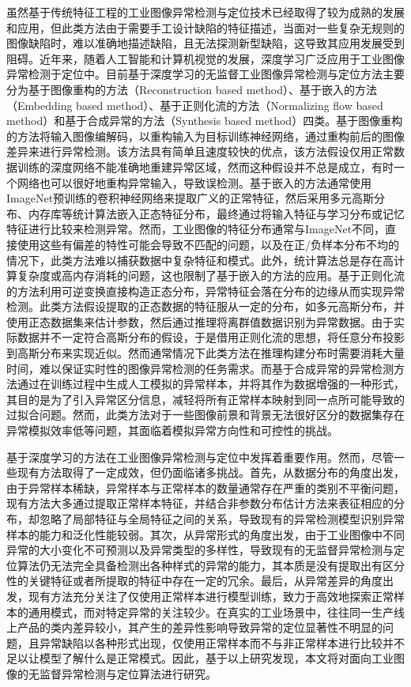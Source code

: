 \documentclass[lang=chs, degree=master, blindreview=false, adobe=false]{yanputhesis}
\begin{document}
虽然基于传统特征工程的工业图像异常检测与定位技术已经取得了较为成熟的发展和应用，但此类方法由于需要手工设计缺陷的特征描述，当面对一些复杂无规则的图像缺陷时，难以准确地描述缺陷，且无法探测新型缺陷，这导致其应用发展受到阻碍。近年来，随着人工智能和计算机视觉的发展，深度学习广泛应用于工业图像异常检测于定位中。目前基于深度学习的无监督工业图像异常检测与定位方法主要分为基于图像重构的方法（Reconstruction based method）、基于嵌入的方法（Embedding based method）、基于正则化流的方法（Normalizing flow based method）和基于合成异常的方法（Synthesis based method）四类。基于图像重构的方法将输入图像编解码，以重构输入为目标训练神经网络，通过重构前后的图像差异来进行异常检测。该方法具有简单且速度较快的优点，该方法假设仅用正常数据训练的深度网络不能准确地重建异常区域，然而这种假设并不总是成立，有时一个网络也可以很好地重构异常输入，导致误检测。基于嵌入的方法通常使用ImageNet预训练的卷积神经网络来提取广义的正常特征，然后采用多元高斯分布、内存库等统计算法嵌入正态特征分布，最终通过将输入特征与学习分布或记忆特征进行比较来检测异常。然而，工业图像的特征分布通常与ImageNet不同，直接使用这些有偏差的特性可能会导致不匹配的问题，以及在正/负样本分布不均的情况下，此类方法难以捕获数据中复杂特征和模式。此外，统计算法总是存在高计算复杂度或高内存消耗的问题，这也限制了基于嵌入的方法的应用。基于正则化流的方法利用可逆变换直接构造正态分布，异常特征会落在分布的边缘从而实现异常检测。此类方法假设提取的正态数据的特征服从一定的分布，如多元高斯分布，并使用正态数据集来估计参数，然后通过推理将离群值数据识别为异常数据。由于实际数据并不一定符合高斯分布的假设，于是借用正则化流的思想，将任意分布投影到高斯分布来实现近似。然而通常情况下此类方法在推理构建分布时需要消耗大量时间，难以保证实时性的图像异常检测的任务需求。而基于合成异常的异常检测方法通过在训练过程中生成人工模拟的异常样本，并将其作为数据增强的一种形式，其目的是为了引入异常区分信息，减轻将所有正常样本映射到同一点所可能导致的过拟合问题。然而，此类方法对于一些图像前景和背景无法很好区分的数据集存在异常模拟效率低等问题，其面临着模拟异常方向性和可控性的挑战。

基于深度学习的方法在工业图像异常检测与定位中发挥着重要作用。然而，尽管一些现有方法取得了一定成效，但仍面临诸多挑战。首先，从数据分布的角度出发，由于异常样本稀缺，异常样本与正常样本的数量通常存在严重的类别不平衡问题，现有方法大多通过提取正常样本特征，并结合非参数分布估计方法来表征相应的分布，却忽略了局部特征与全局特征之间的关系，导致现有的异常检测模型识别异常样本的能力和泛化性能较弱。其次，从异常形式的角度出发，由于工业图像中不同异常的大小变化不可预测以及异常类型的多样性，导致现有的无监督异常检测与定位算法仍无法完全具备检测出各种样式的异常的能力，其本质是没有提取出有区分性的关键特征或者所提取的特征中存在一定的冗余。最后，从异常差异的角度出发，现有方法充分关注了仅使用正常样本进行模型训练，致力于高效地探索正常样本的通用模式，而对特定异常的关注较少。在真实的工业场景中，往往同一生产线上产品的类内差异较小，其产生的差异性影响导致异常的定位显著性不明显的问题，且异常缺陷以各种形式出现，仅使用正常样本而不与非正常样本进行比较并不足以让模型了解什么是正常模式。因此，基于以上研究发现，本文将对面向工业图像的无监督异常检测与定位算法进行研究。
\end{document}
